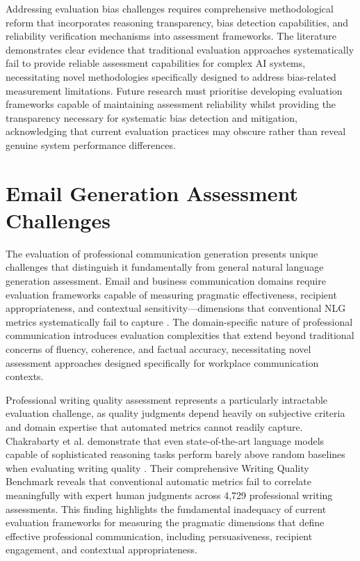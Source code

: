 Addressing evaluation bias challenges requires comprehensive methodological reform that incorporates reasoning transparency, bias detection capabilities, and reliability verification mechanisms into assessment frameworks. The literature demonstrates clear evidence that traditional evaluation approaches systematically fail to provide reliable assessment capabilities for complex AI systems, necessitating novel methodologies specifically designed to address bias-related measurement limitations. Future research must prioritise developing evaluation frameworks capable of maintaining assessment reliability whilst providing the transparency necessary for systematic bias detection and mitigation, acknowledging that current evaluation practices may obscure rather than reveal genuine system performance differences.

\section{Email Generation Assessment Challenges}

The evaluation of professional communication generation presents unique challenges that distinguish it fundamentally from general natural language generation assessment. Email and business communication domains require evaluation frameworks capable of measuring pragmatic effectiveness, recipient appropriateness, and contextual sensitivity—dimensions that conventional NLG metrics systematically fail to capture \cite{li2024llm_nlg_evaluation}. The domain-specific nature of professional communication introduces evaluation complexities that extend beyond traditional concerns of fluency, coherence, and factual accuracy, necessitating novel assessment approaches designed specifically for workplace communication contexts.

Professional writing quality assessment represents a particularly intractable evaluation challenge, as quality judgments depend heavily on subjective criteria and domain expertise that automated metrics cannot readily capture. Chakrabarty et al. demonstrate that even state-of-the-art language models capable of sophisticated reasoning tasks perform barely above random baselines when evaluating writing quality \cite{chakrabarty2025writing_quality}. Their comprehensive Writing Quality Benchmark reveals that conventional automatic metrics fail to correlate meaningfully with expert human judgments across 4,729 professional writing assessments. This finding highlights the fundamental inadequacy of current evaluation frameworks for measuring the pragmatic dimensions that define effective professional communication, including persuasiveness, recipient engagement, and contextual appropriateness.

